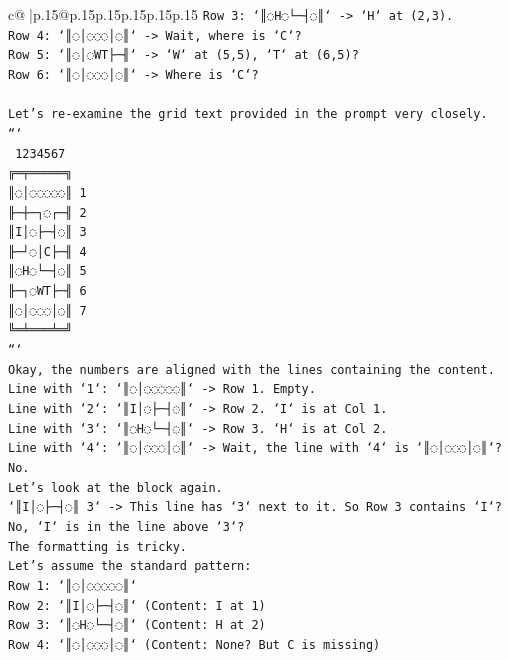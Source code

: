 \documentclass{article}
\begin{document}
{\begin{supertabular}{c@{$\;$}|p{.15\linewidth}@{}p{.15\linewidth}p{.15\linewidth}p{.15\linewidth}p{.15\linewidth}p{.15\linewidth}}
{{{\texttt{Row 3: `║◌H◌└─┤◌║` {-}> `H` at (2,3).} \\
\texttt{Row 4: `║◌│◌◌◌│◌║` {-}> Wait, where is `C`?} \\
\texttt{Row 5: `║◌│◌WT├─╢` {-}> `W` at (5,5), `T` at (6,5)?} \\
\texttt{Row 6: `║◌│◌◌◌│◌║` {-}> Where is `C`?} \\
\\ 
\texttt{Let's re{-}examine the grid text provided in the prompt very closely.} \\
\texttt{```} \\
\texttt{ 1234567} \\
\texttt{╔═╤═════╗} \\
\texttt{║◌│◌◌◌◌◌║ 1} \\
\texttt{╟─┼─┐◌┌─╢ 2} \\
\texttt{║I│◌├─┤◌║ 3} \\
\texttt{╟─┘◌│C├─╢ 4} \\
\texttt{║◌H◌└─┤◌║ 5} \\
\texttt{╟─┐◌WT├─╢ 6} \\
\texttt{║◌│◌◌◌│◌║ 7} \\
\texttt{╚═╧═══╧═╝} \\
\texttt{```} \\
\texttt{Okay, the numbers are aligned with the lines containing the content.} \\
\texttt{Line with `1`: `║◌│◌◌◌◌◌║` {-}> Row 1. Empty.} \\
\texttt{Line with `2`: `║I│◌├─┤◌║` {-}> Row 2. `I` is at Col 1.} \\
\texttt{Line with `3`: `║◌H◌└─┤◌║` {-}> Row 3. `H` is at Col 2.} \\
\texttt{Line with `4`: `║◌│◌◌◌│◌║` {-}> Wait, the line with `4` is `║◌│◌◌◌│◌║`? No.} \\
\texttt{Let's look at the block again.} \\
\texttt{`║I│◌├─┤◌║ 3` {-}> This line has `3` next to it. So Row 3 contains `I`? No, `I` is in the line above `3`?} \\
\texttt{The formatting is tricky.} \\
\texttt{Let's assume the standard pattern:} \\
\texttt{Row 1: `║◌│◌◌◌◌◌║`} \\
\texttt{Row 2: `║I│◌├─┤◌║` (Content: I at 1)} \\
\texttt{Row 3: `║◌H◌└─┤◌║` (Content: H at 2)} \\
\texttt{Row 4: `║◌│◌◌◌│◌║` (Content: None? But C is missing)} \\
}}}
\end{supertabular}}
\end{document}
